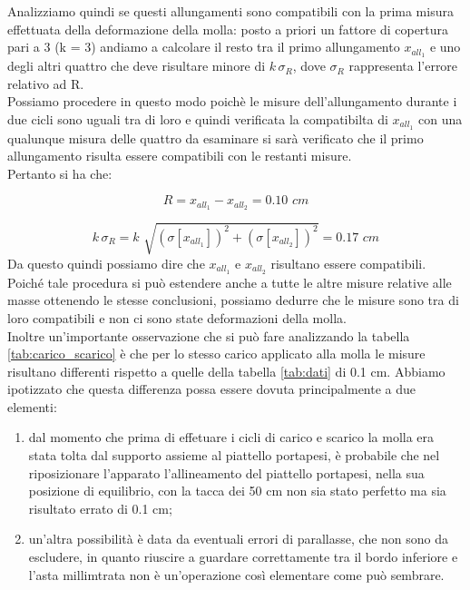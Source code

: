 Analizziamo quindi se questi allungamenti sono compatibili con la prima misura effettuata della deformazione della molla: posto a priori un fattore di copertura pari a 3 (k = 3) andiamo a calcolare il resto tra il primo allungamento $x_{all_1}$ e uno degli altri quattro che deve risultare minore di $k \, \sigma_R$, dove $\sigma_R$ rappresenta l'errore relativo ad R.\\
Possiamo procedere in questo modo poichè le misure dell'allungamento durante i due cicli sono uguali tra di loro e quindi verificata la compatibilta di  $x_{all_1}$ con una qualunque misura delle quattro da esaminare si sarà verificato che il primo allungamento risulta essere compatibili con le restanti misure.\\
Pertanto si ha che:

\begin{equation*}
	R = x_{all_1} - x_{all_2} = 0.10 \,\,cm
\end{equation*}

\begin{equation*}
	k\, \sigma_{R} = k\,\, \sqrt{(\sigma[x_{all_1}])^2 + (\sigma[x_{all_2}])^2} = 0.17 \,\,cm
\end{equation*}
%
Da questo quindi possiamo dire che $x_{all_1}$ e $x_{all_2}$ risultano essere compatibili.\\
Poiché tale procedura si può estendere anche a tutte le altre misure relative alle masse ottenendo le stesse conclusioni, possiamo dedurre che le misure sono tra di loro compatibili e non ci sono state deformazioni della molla.\\
Inoltre un'importante osservazione che si può fare analizzando la tabella \ref{tab:carico_scarico} è che per lo stesso carico applicato alla molla le misure risultano differenti rispetto a quelle della tabella \ref{tab:dati} di 0.1 cm. Abbiamo ipotizzato che questa differenza possa essere dovuta principalmente a due elementi:

\begin{enumerate}
	\item{dal momento che prima di effetuare i cicli di carico e scarico la molla era stata tolta dal supporto assieme al piattello portapesi, è probabile che nel riposizionare l'apparato l'allineamento del piattello portapesi, nella sua posizione di equilibrio, con la tacca dei 50 cm non sia stato perfetto ma sia risultato errato di 0.1 cm;}
	\item{un'altra possibilità è data da eventuali errori di parallasse, che non sono da escludere, in quanto riuscire a guardare correttamente tra il bordo inferiore e l'asta millimtrata non è un'operazione così elementare come può sembrare.}
\end{enumerate}

